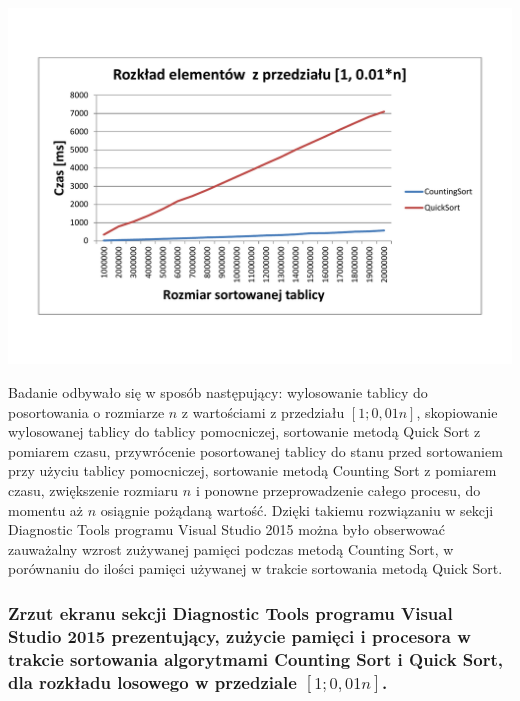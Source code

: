 \documentclass[polish,polish,a4paper]{article}
\begin{document}
\begin{spacing}{1.5}
	\begin{minipage}[H]{\textwidth}
		\begin{center}
			\includegraphics[scale=0.6]{zad4001n.pdf}
			\label{fig:zad4001n}
		\end{center}
	\end{minipage}

Badanie odbywało się w sposób następujący: wylosowanie tablicy do posortowania o rozmiarze $n$ z wartościami z przedziału $[1;0,01n]$, skopiowanie wylosowanej tablicy do tablicy pomocniczej, sortowanie metodą Quick Sort z pomiarem czasu, przywrócenie posortowanej tablicy do stanu przed sortowaniem przy użyciu tablicy pomocniczej, sortowanie metodą Counting Sort z pomiarem czasu, zwiększenie rozmiaru $n$ i ponowne przeprowadzenie całego procesu, do momentu aż $n$ osiągnie pożądaną wartość.	Dzięki takiemu rozwiązaniu w sekcji Diagnostic Tools programu Visual Studio 2015 można było obserwować zauważalny  wzrost zużywanej pamięci podczas metodą Counting Sort, w porównaniu do ilości pamięci używanej w trakcie sortowania metodą Quick Sort.

\subsubsection*{Zrzut ekranu sekcji Diagnostic Tools programu Visual Studio 2015 prezentujący, zużycie pamięci i procesora w trakcie sortowania algorytmami Counting Sort i  Quick Sort, dla rozkładu losowego w przedziale $[1;0,01n]$.}


\end{spacing}
\end{document}
